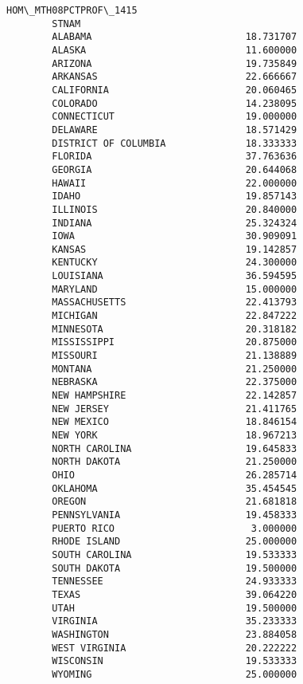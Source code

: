 \documentclass[11pt]{article}
\begin{document}
\begin{Verbatim}[commandchars=\\\{\}]
                              HOM\_MTH08PCTPROF\_1415  
        STNAM                                        
        ALABAMA                           18.731707  
        ALASKA                            11.600000  
        ARIZONA                           19.735849  
        ARKANSAS                          22.666667  
        CALIFORNIA                        20.060465  
        COLORADO                          14.238095  
        CONNECTICUT                       19.000000  
        DELAWARE                          18.571429  
        DISTRICT OF COLUMBIA              18.333333  
        FLORIDA                           37.763636  
        GEORGIA                           20.644068  
        HAWAII                            22.000000  
        IDAHO                             19.857143  
        ILLINOIS                          20.840000  
        INDIANA                           25.324324  
        IOWA                              30.909091  
        KANSAS                            19.142857  
        KENTUCKY                          24.300000  
        LOUISIANA                         36.594595  
        MARYLAND                          15.000000  
        MASSACHUSETTS                     22.413793  
        MICHIGAN                          22.847222  
        MINNESOTA                         20.318182  
        MISSISSIPPI                       20.875000  
        MISSOURI                          21.138889  
        MONTANA                           21.250000  
        NEBRASKA                          22.375000  
        NEW HAMPSHIRE                     22.142857  
        NEW JERSEY                        21.411765  
        NEW MEXICO                        18.846154  
        NEW YORK                          18.967213  
        NORTH CAROLINA                    19.645833  
        NORTH DAKOTA                      21.250000  
        OHIO                              26.285714  
        OKLAHOMA                          35.454545  
        OREGON                            21.681818  
        PENNSYLVANIA                      19.458333  
        PUERTO RICO                        3.000000  
        RHODE ISLAND                      25.000000  
        SOUTH CAROLINA                    19.533333  
        SOUTH DAKOTA                      19.500000  
        TENNESSEE                         24.933333  
        TEXAS                             39.064220  
        UTAH                              19.500000  
        VIRGINIA                          35.233333  
        WASHINGTON                        23.884058  
        WEST VIRGINIA                     20.222222  
        WISCONSIN                         19.533333  
        WYOMING                           25.000000  
\end{Verbatim}
            
\end{document}
